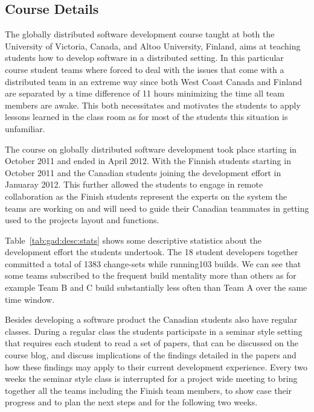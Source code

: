 
\subsection{Course Details}
The globally distributed software development course taught at both the University of Victoria, Canada, and Altoo University, Finland, aims at teaching students how to develop software in a distributed setting.
In this particular course student teams where forced to deal with the issues that come with a distributed team in an extreme way since both West Coast Canada and Finland are separated by a time difference of 11 hours minimizing the time all team members are awake.
This both necessitates and motivates the students to apply lessons learned in the class room as for most of the students this situation is unfamiliar.

The course on globally distributed software development took place starting in October 2011 and ended in April 2012.
With the Finnish students starting in October 2011 and the Canadian students joining the development effort in Januaray 2012.
This further allowed the students to engage in remote collaboration as the Finish students represent the experts on the system the teams are working on and will need to guide their Canadian teammates in getting used to the projects layout and functions.

Table~\ref{tab:gad:desc:stats} shows some descriptive statistics about the development effort the students undertook.
The 18 student developers together committed a total of 1383 change-sets while running103 builds.
We can see that some teams subscribed to the frequent build mentality more than others as for example Team B and C build substantially less often than Team A over the same time window.

Besides developing a software product the Canadian students also have regular classes.
During a regular class the students participate in a seminar style setting that requires each student to read a set of papers, that can be discussed on the course blog, and discuss implications of the findings detailed in the papers and how these findings may apply to their current development experience.
Every two weeks the seminar style class is interrupted for a project wide meeting to bring together all the teams including the Finish team members, to show case their progress and to plan the next steps and for the following two weeks.


